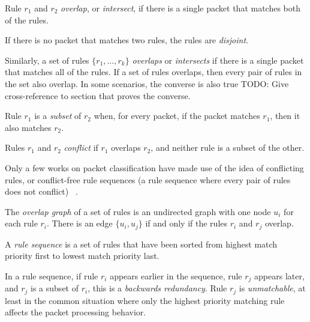 \documentclass[acmsmall]{acmart}
\newcommand{\todo}[1]{}
\renewcommand{\todo}[1]{{\color{red} TODO: {#1}}}
\begin{document}
\begin{definition}
\label{defn:rule-overlap}
Rule $r_1$ and $r_2$ {\em overlap}, or {\em intersect},
if there is a single packet that matches both of the rules.
\end{definition}

\begin{definition}
\label{defn:disjoint-rules}
If there is no packet that matches two rules, the rules are {\em disjoint}.
\end{definition}

Similarly, a set of rules $\{r_1, ..., r_k\}$ {\em overlaps} or {\em intersects}
if there is a single packet that matches all of the rules.
If a set of rules overlaps, then every pair of rules in the set also overlap.
In some scenarios, the converse is also true
\todo{Give cross-reference to section that proves the converse}.

\begin{definition}
\label{defn:rule-subset}
Rule $r_1$ is a {\em subset} of $r_2$ when, for every packet,
if the packet matches $r_1$, then it also matches $r_2$.
\end{definition}

\begin{definition}
\label{defn:rule-conflict}
Rules $r_1$ and $r_2$ {\em conflict} if $r_1$ overlaps $r_2$,
and neither rule is a subset of the other.
\end{definition}
Only a few works on packet classification have made use
of the idea of conflicting rules, or conflict-free rule sequences
(a rule sequence where every pair of rules does not conflict)
~\cite{ASP1999,ASP2000,WSV2001}.

The {\em overlap graph} of a set of rules is an undirected graph
with one node $u_i$ for each rule $r_i$.
There is an edge $\{u_i, u_j\}$ if and only if
the rules $r_i$ and $r_j$ overlap.

A {\em rule sequence} is a set of rules that have been sorted
from highest match priority first to lowest match priority last.

\begin{definition}
\label{defn:backwards-redundant}
In a rule sequence, if rule $r_i$ appears earlier in the sequence,
rule $r_j$ appears later,
and $r_j$ is a subset of $r_i$,
this is a {\em backwards redundancy}.
Rule $r_j$ is {\em unmatchable}, at least in the common situation
where only the highest priority matching rule affects the packet processing behavior.
\end{definition}
\end{document}
